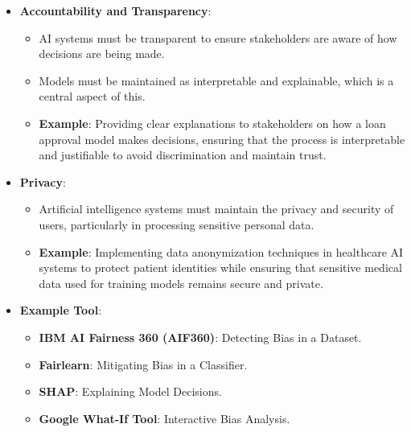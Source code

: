 \documentclass{article}
\begin{document}
\begin{itemize}
\begin{itemize}
\end{itemize}
\item \textbf{Accountability and Transparency}:
\begin{itemize}
\item AI systems must be transparent to ensure stakeholders are aware of how decisions are being made. 
\item Models must be maintained as interpretable and explainable, which is a central aspect of this.
\item \textbf{Example}: Providing clear explanations to stakeholders on how a loan approval model makes decisions, ensuring that the process is interpretable and justifiable to avoid discrimination and maintain trust.
\end{itemize}
\item \textbf{Privacy}:
\begin{itemize}
\item Artificial intelligence systems must maintain the privacy and security of users, particularly in processing sensitive personal data.
\item \textbf{Example}: Implementing data anonymization techniques in healthcare AI systems to protect patient identities while ensuring that sensitive medical data used for training models remains secure and private.
\end{itemize}
\item \textbf{Example Tool}: 
\begin{itemize}
\item \textbf{IBM AI Fairness 360 (AIF360)}: Detecting Bias in a Dataset.
\item \textbf{Fairlearn}: Mitigating Bias in a Classifier.
\item \textbf{SHAP}: Explaining Model Decisions.
\item \textbf{Google What-If Tool}: Interactive Bias Analysis.
\end{itemize}
\end{itemize}
\newpage
\end{document}
